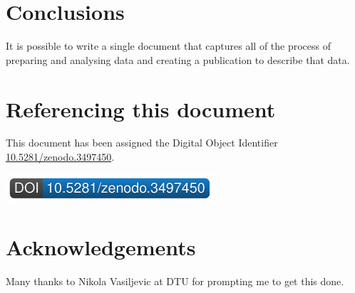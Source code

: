 \documentclass[10pt,]{article}
\begin{document}
\hypertarget{conclusions}{%
\section{Conclusions}\label{conclusions}}

It is possible to write a single document that captures all of the process of preparing and analysing data and creating a publication to describe that data.

\hypertarget{referencing-this-document}{%
\section*{Referencing this document}\label{referencing-this-document}}

This document has been assigned the Digital Object Identifier \href{http://dx.doi.org/10.5281/zenodo.3497450}{10.5281/zenodo.3497450}.

\href{https://doi.org/10.5281/zenodo.3497450}{\includegraphics{DOIBadgeGenerator.pdf}}

\hypertarget{acknowledgements}{%
\section*{Acknowledgements}\label{acknowledgements}}

Many thanks to Nikola Vasiljevic at DTU for prompting me to get this done.

\renewcommand\refname{Bibliography}

\end{document}
